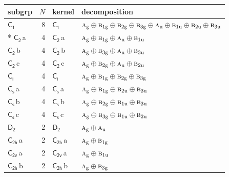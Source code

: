 \documentclass[10pt,a4paper]{article}
\numberwithin{equation}{section}
\newcommand{\grp}[1]{\mathsf{#1}}
\newcommand{\irr}[1]{\text{\normalfont\scshape #1}}
\newcommand{\ptag}[1]{\mathrm{#1}}
\newcommand{\clsletter}[1]{\,{\scriptsize\color{black!55}#1}}
\newlength{\fillwidth}\newlength{\cellwidth}\newlength{\colwidth}
\begin{document}
{\begin{longtable}{@{}lrl>{\RaggedRight\arraybackslash}p{\fillwidth}@{}}
subgrp & $N$ & kernel & decomposition\\\midrule\endhead
\bottomrule\endfoot\endlastfoot
\href{C1.pdf}{$\grp{C_{1}}$} & 8 & \href{C1.pdf}{$\grp{C_{1}}$} & $\irr{a}_{\ptag{g}}\oplus \irr{b}_{1\ptag{g}}\oplus \irr{b}_{2\ptag{g}}\oplus \irr{b}_{3\ptag{g}}\oplus \irr{a}_{\ptag{u}}\oplus \irr{b}_{1\ptag{u}}\oplus \irr{b}_{2\ptag{u}}\oplus \irr{b}_{3\ptag{u}}$\\*
\href{C2.pdf}{$\grp{C_{2}}$}\clsletter{a} & 4 & \href{C2.pdf}{$\grp{C_{2}}$}\clsletter{a} & $\irr{a}_{\ptag{g}}\oplus \irr{b}_{1\ptag{g}}\oplus \irr{a}_{\ptag{u}}\oplus \irr{b}_{1\ptag{u}}$\\
\href{C2.pdf}{$\grp{C_{2}}$}\clsletter{b} & 4 & \href{C2.pdf}{$\grp{C_{2}}$}\clsletter{b} & $\irr{a}_{\ptag{g}}\oplus \irr{b}_{3\ptag{g}}\oplus \irr{a}_{\ptag{u}}\oplus \irr{b}_{3\ptag{u}}$\\
\href{C2.pdf}{$\grp{C_{2}}$}\clsletter{c} & 4 & \href{C2.pdf}{$\grp{C_{2}}$}\clsletter{c} & $\irr{a}_{\ptag{g}}\oplus \irr{b}_{2\ptag{g}}\oplus \irr{a}_{\ptag{u}}\oplus \irr{b}_{2\ptag{u}}$\\
\href{S2.pdf}{$\grp{C_{i}}$} & 4 & \href{S2.pdf}{$\grp{C_{i}}$} & $\irr{a}_{\ptag{g}}\oplus \irr{b}_{1\ptag{g}}\oplus \irr{b}_{2\ptag{g}}\oplus \irr{b}_{3\ptag{g}}$\\
\href{C1v.pdf}{$\grp{C_{s}}$}\clsletter{a} & 4 & \href{C1v.pdf}{$\grp{C_{s}}$}\clsletter{a} & $\irr{a}_{\ptag{g}}\oplus \irr{b}_{1\ptag{g}}\oplus \irr{b}_{2\ptag{u}}\oplus \irr{b}_{3\ptag{u}}$\\
\href{C1v.pdf}{$\grp{C_{s}}$}\clsletter{b} & 4 & \href{C1v.pdf}{$\grp{C_{s}}$}\clsletter{b} & $\irr{a}_{\ptag{g}}\oplus \irr{b}_{2\ptag{g}}\oplus \irr{b}_{1\ptag{u}}\oplus \irr{b}_{3\ptag{u}}$\\
\href{C1v.pdf}{$\grp{C_{s}}$}\clsletter{c} & 4 & \href{C1v.pdf}{$\grp{C_{s}}$}\clsletter{c} & $\irr{a}_{\ptag{g}}\oplus \irr{b}_{3\ptag{g}}\oplus \irr{b}_{1\ptag{u}}\oplus \irr{b}_{2\ptag{u}}$\\
\href{D2.pdf}{$\grp{D_{2}}$} & 2 & \href{D2.pdf}{$\grp{D_{2}}$} & $\irr{a}_{\ptag{g}}\oplus \irr{a}_{\ptag{u}}$\\
\href{C2h.pdf}{$\grp{C_{2h}}$}\clsletter{a} & 2 & \href{C2h.pdf}{$\grp{C_{2h}}$}\clsletter{a} & $\irr{a}_{\ptag{g}}\oplus \irr{b}_{1\ptag{g}}$\\
\href{C2v.pdf}{$\grp{C_{2v}}$}\clsletter{a} & 2 & \href{C2v.pdf}{$\grp{C_{2v}}$}\clsletter{a} & $\irr{a}_{\ptag{g}}\oplus \irr{b}_{1\ptag{u}}$\\
\href{C2h.pdf}{$\grp{C_{2h}}$}\clsletter{b} & 2 & \href{C2h.pdf}{$\grp{C_{2h}}$}\clsletter{b} & $\irr{a}_{\ptag{g}}\oplus \irr{b}_{3\ptag{g}}$\\

\end{longtable}}
\end{document}
